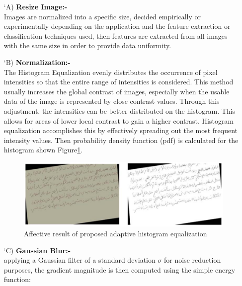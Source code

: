 \begin{itemize}[labelindent=1em,labelsep=0.25cm,leftmargin=*]
        \item[\char `A)] \textbf{Resize Image:-}\\
        Images are normalized into a specific size, decided empirically or experimentally depending on the application and the feature extraction or classification techniques used, then features are extracted from all images  with the same size in order to provide data uniformity. 
        \item[\char `B)] \textbf{Normalization:-}\\  
        The Histogram Equalization \cite{equalization} evenly distributes the occurrence of pixel intensities so that the entire range of intensities is considered. This method usually increases the global contrast of images, especially when the usable data of the image is represented by close contrast values. Through this adjustment, the intensities can be better distributed on the histogram. This allows for areas of lower local contrast to gain a higher contrast. Histogram equalization accomplishes this by effectively spreading out the most frequent intensity values. Then probability density function (pdf) is calculated for the histogram shown Figure\ref{fig:equalize}.
        \begin{figure}[!htb]
            \centering
            \includegraphics[width=11cm]{images/equalize.png}
            \caption{Affective result of proposed adaptive histogram equalization}
            \label{fig:equalize}
        \end{figure}
        \item[\char `C)] \textbf{Gaussian Blur:-}\\ 
        applying a Gaussian filter of a standard deviation   $\sigma$ for noise
        reduction purposes, the gradient magnitude is then computed using the
        simple energy function:
        

\end{itemize}
